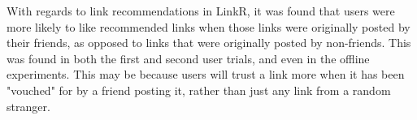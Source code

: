 With regards to link recommendations in LinkR, it was found that users were more likely to like recommended links when those links were originally posted by their friends, as opposed to links that were originally posted by non-friends. This was found in both the first and second user trials, and even in the offline experiments. This may be because users will trust a link more when it has been "vouched" for by a friend posting it, rather than just any link from a random stranger.

